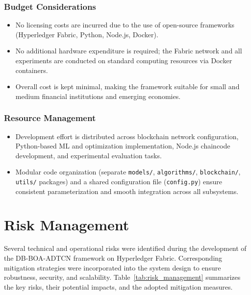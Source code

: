 \subsubsection*{Budget Considerations}

\begin{itemize}
\item No licensing costs are incurred due to the use of open-source frameworks (Hyperledger Fabric, Python, Node.js, Docker).
\item No additional hardware expenditure is required; the Fabric network and all experiments are conducted on standard computing resources via Docker containers.
\item Overall cost is kept minimal, making the framework suitable for small and medium financial institutions and emerging economies.
\end{itemize}

\subsubsection*{Resource Management}

\begin{itemize}
\item Development effort is distributed across blockchain network configuration, Python-based ML and optimization implementation, Node.js chaincode development, and experimental evaluation tasks.
\item Modular code organization (separate \texttt{models/}, \texttt{algorithms/}, \texttt{blockchain/}, \texttt{utils/} packages) and a shared configuration file (\texttt{config.py}) ensure consistent parameterization and smooth integration across all subsystems.
\end{itemize}

\section{Risk Management}
Several technical and operational risks were identified during the development of the DB-BOA-ADTCN framework on Hyperledger Fabric. Corresponding mitigation strategies were incorporated into the system design to ensure robustness, security, and scalability. Table~\ref{tab:risk_management} summarizes the key risks, their potential impacts, and the adopted mitigation measures.

